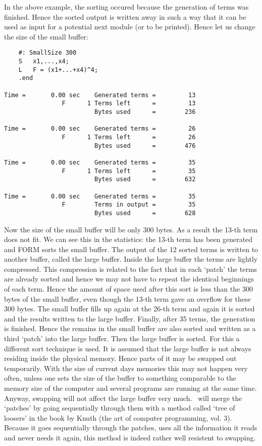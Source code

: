 In the above example, the sorting occured because the generation of terms 
was finished. Hence the sorted output is written away in such a way that it 
can be used as input for a potential next module (or to be printed). 
Hence let us change the size of the small buffer:
\begin{verbatim}
    #: SmallSize 300
    S	x1,...,x4;
    L	F = (x1+...+x4)^4;
    .end

Time =       0.00 sec    Generated terms =         13
                F      1 Terms left      =         13
                         Bytes used      =        236

Time =       0.00 sec    Generated terms =         26
                F      1 Terms left      =         26
                         Bytes used      =        476

Time =       0.00 sec    Generated terms =         35
                F      1 Terms left      =         35
                         Bytes used      =        632

Time =       0.00 sec    Generated terms =         35
                F        Terms in output =         35
                         Bytes used      =        628
\end{verbatim}
Now the size of the small buffer will be only 300 bytes. As a result the 
13-th term does not fit. We can see this in the statistics: the 13-th term 
has been generated and FORM sorts the small buffer. The output of the 12 
sorted terms is written to another buffer, called the
large buffer. Inside the large 
buffer the terms are lightly compressed. This compression is related to the 
fact that in each `patch' the terms are already sorted and 
hence we may not have to repeat the identical beginnings of each term. 
Hence the amount of space used after this sort is less than the 300 bytes 
of the small buffer, even though the 13-th term gave an overflow for these 
300 bytes. The small buffer fills up again at the 26-th term and again it 
is sorted and the results written to the large buffer. Finally, after 35 
terms, the generation is finished. Hence the remains in the small buffer 
are also sorted and written as a third `patch' into the large buffer. Then 
the large buffer is sorted. For this a different sort technique is used. It 
is assumed that the large buffer is not always residing inside the physical 
memory. Hence parts of it may be swapped out temporarily. With the size of 
current days memories this may not happen very often, unless one sets the 
size of the buffer to something comparable to the memory size of the 
computer and several programs are running at the same time. Anyway, 
swapping will not affect the large buffer very much. \FORM\ will merge the 
`patches' by going sequentially through them with a method called 
`tree of loosers' in the book by Knuth 
(the art of computer programming, vol. 3). Because it goes sequentially 
through the patches, uses all the information it reads and never needs it 
again, this method is indeed rather well resistent to swapping.


